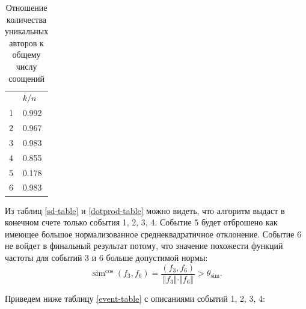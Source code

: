 \documentclass[12pt, a4paper]{article}
\DeclareMathOperator{\simu}{sim}
\begin{document}
	
	\begin{table}[H]
	\centering
	\caption{Отношение количества уникальных авторов к общему числу соощений}
	\begin{tabular}{l | l}
	& $k/n$ \\ 
	1 & 0.992 \\ 
	2 & 0.967 \\ 
	3 & 0.983 \\ 
	4 & 0.855 \\ 
	5 & 0.178 \\ 
	6 & 0.983 \\ 
	\end{tabular}
	
	\label{spam-table}
	\end{table}
	
	Из таблиц \ref{sd-table} и \ref{dotprod-table} можно видеть, что алгоритм выдаст в конечном счете только события 1, 2, 3, 4. Событие 5 будет отброшено как имеющее большое нормализованное среднеквадратичное отклонение. Событие 6 не войдет в финальный результат потому, что значение похожести функций частоты для событий 3 и 6 больше допустимой нормы:
\begin{equation}
	\simu^{\cos}(f_{3}, f_{6}) = \frac{(f_{3}, f_{6})}{ \Vert f_{3} \Vert \cdot \Vert f_{6} \Vert} > \theta_{\simu}.
\end{equation}

Приведем ниже таблицу \ref{event-table} с описаниями событий 1, 2, 3, 4:
	
\end{document}
